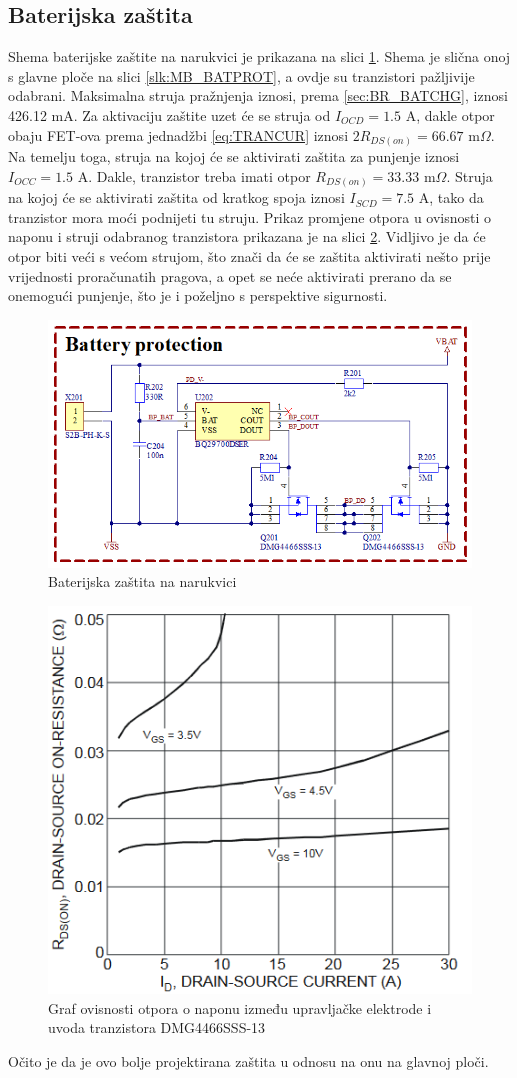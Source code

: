 \subsection{Baterijska zaštita}
\sloppy Shema baterijske zaštite na narukvici je prikazana na slici \ref{slk:BR_BATPROT}. Shema je slična onoj s glavne ploče na slici \ref{slk:MB_BATPROT}, a ovdje su tranzistori pažljivije odabrani. Maksimalna struja pražnjenja iznosi, prema \ref{sec:BR_BATCHG}, iznosi 426.12 mA. Za aktivaciju zaštite uzet će se struja od $I_{OCD}=1.5\textrm{ A}$, dakle otpor obaju FET-ova prema jednadžbi \ref{eq:TRANCUR} iznosi ${2R_{DS(on)}=66.67\textrm{ m}\Omega}$. Na temelju toga, struja na kojoj će se aktivirati zaštita za punjenje iznosi $I_{OCC}=1.5\textrm{ A}$. Dakle, tranzistor treba imati otpor $R_{DS(on)}=33.33\textrm{ m}\Omega$. Struja na kojoj će se aktivirati zaštita od kratkog spoja iznosi $I_{SCD}=7.5\textrm{ A}$, tako da tranzistor mora moći podnijeti tu struju. Prikaz promjene otpora u ovisnosti o naponu i struji odabranog tranzistora prikazana je na slici \ref{slk:RDS_NEW}. Vidljivo je da će otpor biti veći s većom strujom, što znači da će se zaštita aktivirati nešto prije vrijednosti proračunatih pragova, a opet se neće aktivirati prerano da se onemogući punjenje, što je i poželjno s perspektive sigurnosti.
\begin{figure}[htb]
    \centering
    \includegraphics[width=10 cm]{Figures/BR_BATPROT.png}
    \caption{Baterijska zaštita na narukvici}
    \label{slk:BR_BATPROT}
\end{figure}
\begin{figure}[h!tb]
    \centering
    \includegraphics[width=6 cm]{Figures/RDS_NEW.PNG}
    \caption{Graf ovisnosti otpora o naponu između upravljačke elektrode i uvoda tranzistora DMG4466SSS-13 \cite{di:dmg4466}}
    \label{slk:RDS_NEW}
\end{figure}
Očito je da je ovo bolje projektirana zaštita u odnosu na onu na glavnoj ploči.

